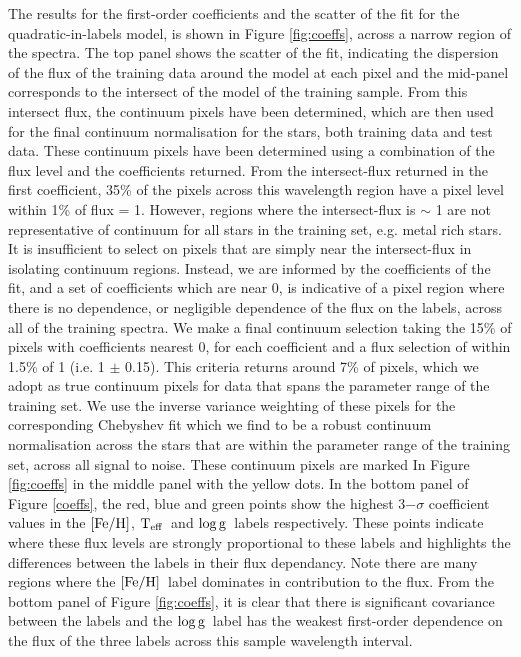 \documentclass[12pt, preprint]{aastex}
\newcommand{\teff}{\mbox{$\rm T_{eff}$}}
\newcommand{\feh}{\mbox{$\rm [Fe/H]$}}
\newcommand{\logg}{\mbox{$\rm \log g$}}
\begin{document}
The results for the first-order coefficients and the scatter of the fit for the quadratic-in-labels model, is shown in Figure \ref{fig:coeffs}, across a narrow region of the spectra. The top panel shows the scatter of the fit, indicating the dispersion of the flux of the training data around the model at each pixel and the mid-panel corresponds to the intersect of the model of the training sample. From this intersect flux, the continuum pixels have been determined, which  are then used for the final continuum normalisation for the stars, both training data and test data. These continuum pixels have been determined using a combination of the flux level and the coefficients returned.  From the intersect-flux returned in the first coefficient, 35\% of the pixels across this wavelength region have a pixel level within 1\% of flux = 1. However, regions where the intersect-flux is $\sim$ 1 are not representative of continuum for all stars in the training set, e.g. metal rich stars. It is insufficient to select on pixels that are simply near the intersect-flux in isolating continuum regions. Instead, we are informed by the coefficients of the fit, and a set of coefficients which are near 0, is indicative of a pixel region where there is no dependence, or negligible dependence of the flux on the labels, across all of the training spectra. We make a final continuum selection taking the 15\% of pixels with coefficients nearest 0, for each coefficient and a flux selection of within 1.5\% of 1 (i.e. 1 $\pm$ 0.15). This criteria returns around  7\% of pixels, which we adopt as true continuum pixels for data that spans the parameter range of the training set. We use the inverse variance weighting of these pixels for the corresponding Chebyshev fit which we find to be a robust continuum normalisation across the stars that are within the parameter range of the training set, across all signal to noise. These continuum pixels are marked In Figure \ref{fig:coeffs} in the middle panel with the yellow dots. In the bottom panel of Figure \ref{coeffs}, the red, blue and green points show the highest 3$-\sigma$ coefficient values in the \feh, \teff\ and \logg\ labels respectively. These points indicate where these flux levels are strongly proportional to these labels and highlights the differences between the labels in their flux dependancy. Note there are many regions where the \feh\ label dominates in contribution to the flux. From the bottom panel of Figure \ref{fig:coeffs}, it is clear that there is significant covariance between the labels and the \logg\ label has the weakest first-order dependence on the flux of the three labels across this sample wavelength interval. 
\end{document}
